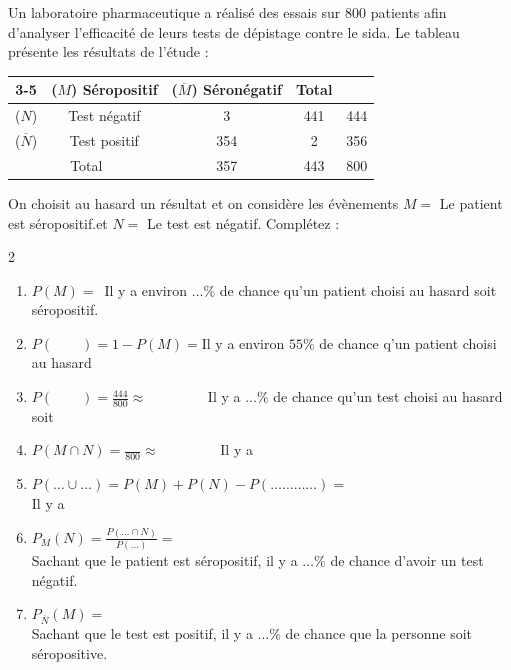 \documentclass[main.tex]{subfiles}
\begin{document}
\begin{exercise}\label{chapter02:exercise:A01}
	Un laboratoire pharmaceutique a réalisé des essais sur 800 patients afin d'analyser l'efficacité de leurs tests de dépistage contre le sida. Le tableau présente les résultats de l'étude : 
	\begin{center}
		\renewcommand{\arraystretch}{1.8}
		\begin{tabular}{|cc|c|c|c|}
			\cline{3-5} \multicolumn{2}{c|}{}& ($M$) \quad Séropositif & ($\overline{M}$) \quad Séronégatif & \hspace{4mm} Total \hspace{4mm} \\\hline
			($N$) & Test négatif & 3 & 441 & 444\\\hline
			($\overline{N}$) & Test positif & 354 & 2 & 356\\\hline
			\multicolumn{2}{|c|}{Total} & 357 & 443 & 800 \\\hline
		\end{tabular}
	\end{center}
	On choisit au hasard un résultat et on considère les évènements $M=$ \og Le patient est séropositif.\fg  et $N=$ \og Le test est négatif\fg. Complétez :
	\begin{spacing}{2}
		\begin{enumerate}[leftmargin=*,label=\arabic*)]
			\item $P(M)=$\dotfill \ Il y a environ $\ldots \%$ de chance qu'un patient choisi au hasard soit séropositif.
			\item $P(\qquad)= 1-P(M)=$\dotfill  Il y a environ $55\%$ de chance q'un patient choisi au hasard\dotfill 
			\item $P(\qquad) =\frac{444}{800}\approx\qquad\qquad$   Il y a $\ldots\%$ de chance qu'un test choisi au hasard soit \dotfill 
			\item $P(M\cap N)= \frac{ }{800}\approx\qquad\qquad$  Il y a \dotfill 
			\item $P(\ldots \cup \ldots )=P(M)+P(N) - P(\ldots\ldots\ldots\ldots)=$\dotfill \\
			Il y a \dotfill  
			\item $P_M(N)=\frac{P(\ldots\cap N)}{P(\ldots)} = $\dotfill \\
			Sachant que le patient est séropositif, il y a $\ldots \%$ de chance d'avoir un test négatif.
			\item $P_{\overline{N}}(M)=$\dotfill \\
			Sachant que le test est positif, il y a $\ldots \%$ de chance que la personne soit séropositive.
		\end{enumerate} 
	\end{spacing}  \vspace{-0.5em}
\end{exercise} 
\end{document}
